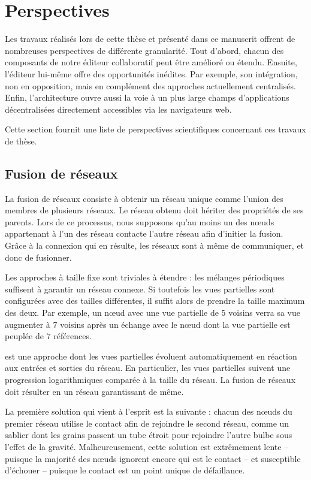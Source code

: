 
\section{Perspectives}
\label{conclu:sec:perspectives}

Les travaux réalisés lors de cette thèse et présenté dans ce manuscrit offrent
de nombreuses perspectives de différente granularité. Tout d'abord, chacun des
composants de notre éditeur collaboratif peut être amélioré ou étendu. Ensuite,
l'éditeur lui-même offre des opportunités inédites. Par exemple, son
intégration, non en opposition, mais en complément des approches actuellement
centralisés. Enfin, l'architecture ouvre aussi la voie à un plus large champs
d'applications décentralisées directement accessibles via les navigateurs web.

Cette section fournit une liste de perspectives scientifiques concernant ces
travaux de thèse.

\subsection{Fusion de réseaux}

\label{conclu:subsec:merging}

La fusion de réseaux consiste à obtenir un réseau unique comme l'union des
membres de plusieurs réseaux. Le réseau obtenu doit hériter des propriétés de
ses parents.  Lors de ce processus, nous supposons qu'au moins un des nœuds
appartenant à l'un des réseau contacte l'autre réseau afin d'initier la
fusion. Grâce à la connexion qui en résulte, les réseaux sont à même de
communiquer, et donc de fusionner.

Les approches à taille fixe sont triviales à étendre : les mélanges périodiques
suffisent à garantir un réseau connexe. Si toutefois les vues partielles sont
configurées avec des tailles différentes, il suffit alors de prendre la taille
maximum des deux. Par exemple, un nœud avec une vue partielle de 5 voisins verra
sa vue augmenter à $7$ voisins après un échange avec le nœud dont la vue
partielle est peuplée de $7$ références.

\SPRAY est une approche dont les vues partielles évoluent automatiquement en
réaction aux entrées et sorties du réseau. En particulier, les vues partielles
suivent une progression logarithmiques comparée à la taille du réseau. La fusion
de réseaux \SPRAY doit résulter en un réseau \SPRAY garantissant de même.

La première solution qui vient à l'esprit est la suivante : chacun des nœuds du
premier réseau utilise le contact afin de rejoindre le second réseau, comme un
sablier dont les grains passent un tube étroit pour rejoindre l'autre bulbe sous
l'effet de la gravité. Malheureusement, cette solution est extrêmement lente --
puisque la majorité des nœuds ignorent encore qui est le contact -- et
susceptible d'échouer -- puisque le contact est un point unique de défaillance.

